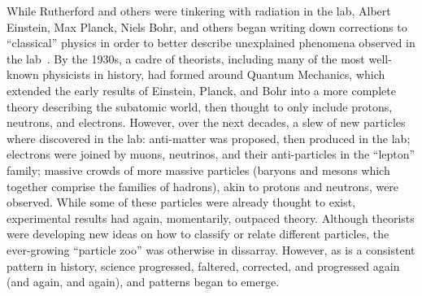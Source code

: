 \begin{dissertationintroduction}
While Rutherford and others were tinkering with radiation in the lab, Albert Einstein, Max Planck, Niels Bohr, and others began writing down corrections to ``classical'' physics in order to better describe unexplained phenomena observed in the lab~\cite{EinsteinPhotoelectric, Planck, Bohr}. 
By the 1930s, a cadre of theorists, including many of the most well-known physicists in history\footnotemark{}, had formed around Quantum Mechanics, which extended the early results of Einstein, Planck, and Bohr into a more complete theory describing the subatomic world, then thought to only include protons, neutrons, and electrons. 
However, over the next decades, a slew of new particles where discovered in the lab: 
anti-matter was proposed, then produced in the lab; %
electrons were joined by muons, neutrinos, and their anti-particles in the ``lepton'' family; %
massive crowds of more massive particles (baryons and mesons which together comprise the families of hadrons), akin to protons and neutrons, were observed. %
While some of these particles were already thought to exist, experimental results had again, momentarily, outpaced theory. 
Although theorists were developing new ideas on how to classify or relate different particles, the ever-growing ``particle zoo'' was otherwise in dissarray. 
However, as is a consistent pattern in history, science progressed, faltered, corrected, and progressed again (and again, and again), and patterns began to emerge. 


\end{dissertationintroduction}
